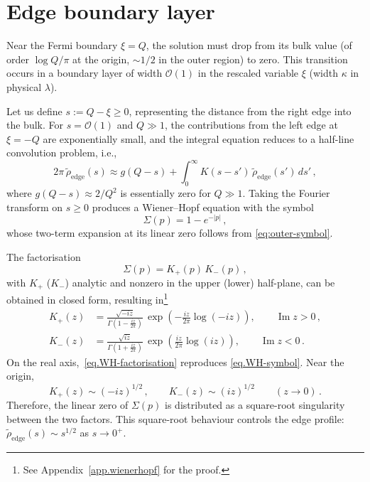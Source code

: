 \documentclass[11pt,a4paper]{article}
\theoremstyle{definition}
\begin{document}
\section{Edge boundary layer}\label{sec.edge}

Near the Fermi boundary $\xi = Q$, the solution must drop from its bulk value
(of order $\log Q/\pi$ at the origin, $\sim 1/2$ in the outer region) to zero.
This transition occurs in a boundary layer of width $\mathcal O(1)$ in the rescaled
variable $\xi$ (width $\kappa$ in physical $\lambda$).


Let us define $s := Q - \xi \geq 0$, representing the distance from the right edge into the bulk.
For $s = \mathcal O(1)$ and $Q \gg 1$, the contributions from the left edge at
$\xi = -Q$ are exponentially small, and the integral equation reduces to a
half-line convolution problem, i.e.,
\begin{equation}\label{eq.half-line}
  2\pi\,\tilde\rho_{\mathrm{edge}}(s)
  \approx g(Q-s) + \int_0^{\infty} K(s - s')\,\tilde\rho_{\mathrm{edge}}(s')\,ds'\,,
\end{equation}
where $g(Q-s) \approx 2/Q^2$ is essentially zero for $Q \gg 1$.
Taking the Fourier transform on $s \geq 0$ produces a Wiener--Hopf equation
with the symbol
\begin{equation}\label{eq.WH-symbol}
  \Sigma(p) = 1 - e^{-|p|}\,,
\end{equation}
whose two-term expansion at its linear zero follows from
\eqref{eq:outer-symbol}.


The factorisation
\begin{equation}\label{eq.WH-factorisation}
    \Sigma(p) = K_+(p)\,K_-(p)\, ,
\end{equation}
with $K_+$ ($K_-$) analytic
and nonzero in the upper (lower) half-plane, can be obtained in closed form, resulting in\footnote{See Appendix~\ref{app.wienerhopf} for the proof.} 
\begin{align}
  K_+(z) &= \frac{\sqrt{-iz}}{\Gamma \left(1 - \frac{iz}{2\pi}\right)}\,
  \exp \left(-\frac{iz}{2\pi}\log(-iz)\right),
  \qquad \operatorname{Im} z > 0\,, \label{eq.Kplus}\\[6pt]
  K_-(z) &= \frac{\sqrt{iz}}{\Gamma \left(1 + \frac{iz}{2\pi}\right)}\,
  \exp \left(\frac{iz}{2\pi}\log(iz)\right),
  \qquad \operatorname{Im} z < 0\,. \label{eq.Kminus}
\end{align}
On the real axis,~\eqref{eq.WH-factorisation} reproduces
\eqref{eq.WH-symbol}.  Near the origin,
\begin{equation}\label{eq.K-origin}
  K_+(z) \sim (-iz)^{1/2}\,,\qquad
  K_-(z) \sim (iz)^{1/2}\qquad (z\to0)\,.
\end{equation}
Therefore, the linear zero of $\Sigma(p)$ is distributed as a square-root singularity
between the two factors.
This square-root behaviour controls the edge profile:
$\tilde\rho_{\mathrm{edge}}(s) \sim s^{1/2}$ as $s \to 0^+$.
\end{document}
